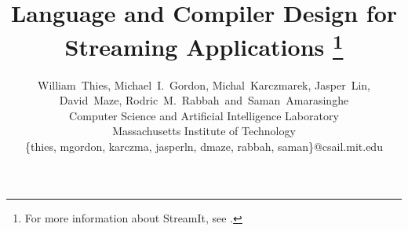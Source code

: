 \documentclass[10pt,twocolumn]{article}
\begin{document}
\title{Language and Compiler Design for Streaming Applications%
\thanks{For more information about StreamIt, see \streamiturl.}}

\author{William~Thies, Michael~I.~Gordon, Michal~Karczmarek, Jasper~Lin,\\
 David~Maze, Rodric~M.~Rabbah~and~Saman~Amarasinghe\\
 Computer Science and Artificial Intelligence Laboratory\\
 Massachusetts Institute of Technology\\
 \{thies, mgordon, karczma, jasperln, dmaze, rabbah, saman\}@csail.mit.edu}

\maketitle

\newcommand{\makeline}[0]{\rule{0cm}{0cm}\\\hrule\rule{0cm}{0cm}}


\thispagestyle{empty}

\begin{abstract}

\end{abstract}







%
%
%









%
\end{document}
